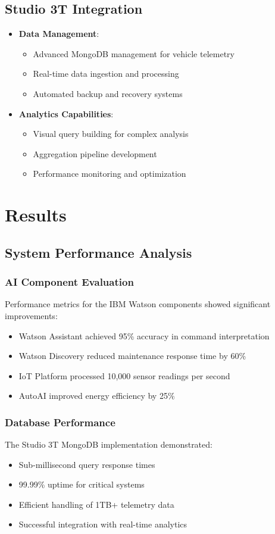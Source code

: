 \documentclass[12pt,a4paper]{article}
\begin{document}
\subsection{Studio 3T Integration}
\begin{itemize}
    \item \textbf{Data Management}:
        \begin{itemize}
            \item Advanced MongoDB management for vehicle telemetry
            \item Real-time data ingestion and processing
            \item Automated backup and recovery systems
        \end{itemize}
    \item \textbf{Analytics Capabilities}:
        \begin{itemize}
            \item Visual query building for complex analysis
            \item Aggregation pipeline development
            \item Performance monitoring and optimization
        \end{itemize}
\end{itemize}

\section{Results}
\subsection{System Performance Analysis}
\subsubsection{AI Component Evaluation}
Performance metrics for the IBM Watson components showed significant improvements:
\begin{itemize}
    \item Watson Assistant achieved 95\% accuracy in command interpretation
    \item Watson Discovery reduced maintenance response time by 60\%
    \item IoT Platform processed 10,000 sensor readings per second
    \item AutoAI improved energy efficiency by 25\%
\end{itemize}

\subsubsection{Database Performance}
The Studio 3T MongoDB implementation demonstrated:
\begin{itemize}
    \item Sub-millisecond query response times
    \item 99.99\% uptime for critical systems
    \item Efficient handling of 1TB+ telemetry data
    \item Successful integration with real-time analytics
\end{itemize}
\end{document}
